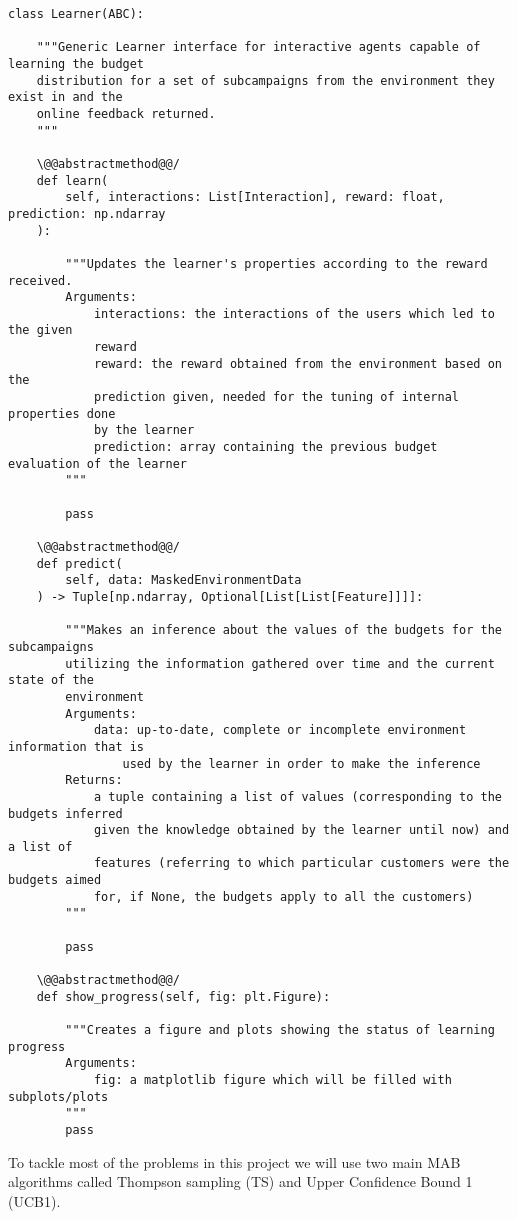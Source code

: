 \begin{lstlisting}[style=Python]
class Learner(ABC):

    """Generic Learner interface for interactive agents capable of learning the budget
    distribution for a set of subcampaigns from the environment they exist in and the
    online feedback returned.
    """

    \@@abstractmethod@@/
    def learn(
        self, interactions: List[Interaction], reward: float, prediction: np.ndarray
    ):

        """Updates the learner's properties according to the reward received.
        Arguments:
            interactions: the interactions of the users which led to the given
            reward
            reward: the reward obtained from the environment based on the
            prediction given, needed for the tuning of internal properties done
            by the learner
            prediction: array containing the previous budget evaluation of the learner
        """

        pass

    \@@abstractmethod@@/
    def predict(
        self, data: MaskedEnvironmentData
    ) -> Tuple[np.ndarray, Optional[List[List[Feature]]]]:

        """Makes an inference about the values of the budgets for the subcampaigns
        utilizing the information gathered over time and the current state of the
        environment
        Arguments:
            data: up-to-date, complete or incomplete environment information that is
                used by the learner in order to make the inference
        Returns:
            a tuple containing a list of values (corresponding to the budgets inferred
            given the knowledge obtained by the learner until now) and a list of
            features (referring to which particular customers were the budgets aimed
            for, if None, the budgets apply to all the customers)
        """

        pass

    \@@abstractmethod@@/
    def show_progress(self, fig: plt.Figure):

        """Creates a figure and plots showing the status of learning progress
        Arguments:
            fig: a matplotlib figure which will be filled with subplots/plots
        """
        pass
\end{lstlisting}

To tackle most of the problems in this project we will use two main MAB algorithms called Thompson sampling (TS) and Upper Confidence Bound 1 (UCB1).


